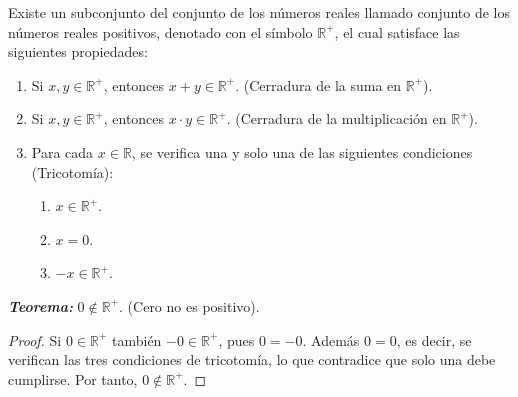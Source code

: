 \documentclass[11pt]{article}
\newcommand{\R}{\mathbb{R}}
\newcommand{\bfit}[1]{\textbf{\textit{#1}}}
\begin{document}
Existe un subconjunto del conjunto de los números reales llamado conjunto de los números reales positivos, denotado con el símbolo $\R^+$, el cual satisface las siguientes propiedades:%
\vspace{-1em} \begin{enumerate}[start=12]%
\item Si $x, y \in \R^+$, entonces $x + y \in \R^+$. (Cerradura de la suma en $\R^+$).
\item Si $x, y \in \R^+$, entonces $x \cdot y \in \R^+$. (Cerradura de la multiplicación en $\R^+$).
\item Para cada $x\in \R$, se verifica una y solo una de las siguientes condiciones (Tricotomía):
\begin{enumerate}[label=\roman*)]
\item $x \in \R^+$.
\item $x = 0$.
\item $-x \in \R^+$.
\end{enumerate}
\end{enumerate}\vspace{-1em}
%
\bfit{Teorema:} $0\notin \R^+$. (Cero no es positivo).
\vspace{-1em}
\begin{proof}
Si $0\in \R^+$ también $-0\in \R^+$, pues $0=-0$. Además $0=0$, es decir, se verifican las tres condiciones de tricotomía, lo que contradice que solo una debe cumplirse. Por tanto, $0\notin \R^+$.
\end{proof} \vspace{-1em}
\end{document}
